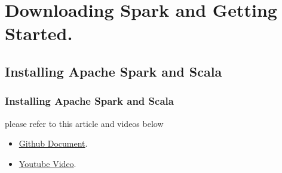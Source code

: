 \section{Downloading Spark and Getting Started.} 
\subsection{Installing Apache Spark and Scala}
\begin{frame}
	\frametitle{Installing Apache Spark and Scala}
	please refer to this article and videos below
	\begin{itemize}[<+->]
	\item \href{https://github.com/MostafaAlaa2016/Spark\_Installation}{\color{blue}Github Document}.
	\item \href{https://www.youtube.com/watch?v=WlE7RNdtfwE}{\color{blue}Youtube Video}.
	\end{itemize}
\end{frame}

